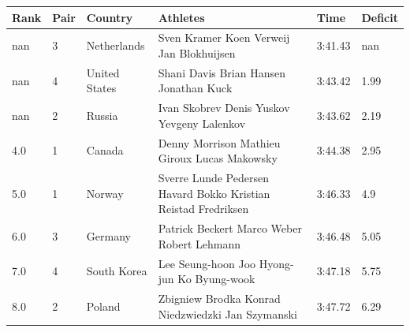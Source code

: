 \documentclass{article}
\begin{document}
\begin{tabular}{llllll}
\toprule
Rank & Pair & Country & Athletes & Time & Deficit \\
\midrule
nan & 3 & Netherlands & Sven Kramer Koen Verweij Jan Blokhuijsen & 3:41.43 & nan \\
nan & 4 & United States & Shani Davis Brian Hansen Jonathan Kuck & 3:43.42 & 1.99 \\
nan & 2 & Russia & Ivan Skobrev Denis Yuskov Yevgeny Lalenkov & 3:43.62 & 2.19 \\
4.0 & 1 & Canada & Denny Morrison Mathieu Giroux Lucas Makowsky & 3:44.38 & 2.95 \\
5.0 & 1 & Norway & Sverre Lunde Pedersen Havard Bokko Kristian Reistad Fredriksen & 3:46.33 & 4.9 \\
6.0 & 3 & Germany & Patrick Beckert Marco Weber Robert Lehmann & 3:46.48 & 5.05 \\
7.0 & 4 & South Korea & Lee Seung-hoon Joo Hyong-jun Ko Byung-wook & 3:47.18 & 5.75 \\
8.0 & 2 & Poland & Zbigniew Brodka Konrad Niedzwiedzki Jan Szymanski & 3:47.72 & 6.29 \\
\bottomrule
\end{tabular}
\end{document}
